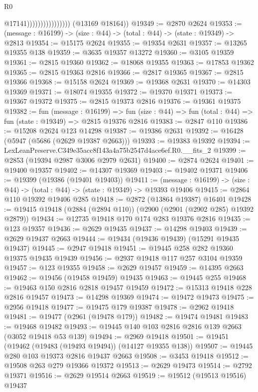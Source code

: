 \begin{lexlean}{R0}
\begin{coremodule}
                                      @17141))))))))))))))))
      (@13169 @18164))
@19349 := @2870 @2624
@19353 := (message : @16199) -> (size : @44) -> (total : @44) -> (state : @19349) -> @2813
@19354 := @15175 @2624
@19355 := @19354 @2631
@19357 := @13265 @19355 @138
@19359 := @3635 @19357 @13272
@19360 := @3105 @19359
@19361 := @2815 @19360
@19362 := @18068 @19355
@19363 := @17853 @19362
@19365 := @2815 @19363 @2816
@19366 := @2817 @19365
@19367 := @2815 @19366
@19368 := @15158 @2624
@19369 := @19368 @2631
@19370 := @14303 @19369
@19371 := @18074 @19355
@19372 := @19370 @19371
@19373 := @19367 @19372
@19375 := @2815 @19373 @2816
@19376 := @19361 @19375
@19382 := fun (message : @16199) =>
  fun (size : @44) => fun (total : @44) => fun (state : @19349) => @2815 @19376 @2816
@19383 := @2847 @110
@19386 := @15208 @2624 @123 @14298
@19387 := @19386 @2631
@19392 := @16428 (@5947 (@5686 (@2629 @19387 @2663)))
@19393 := @19383 @19392
@19394 := LexLeanPreserve.C349e35acc8f143a4a75b2547d4ace6ef.R0.__fits_2
@19399 := @2853 (@19394 @2987 @3006 @2979 @2631)
@19400 := @2874 @2624
@19401 := @19400 @19357
@19402 := @14307 @19369
@19403 := @19402 @19371
@19406 := @19399 (@19386 (@19401 @19403))
@19411 := (message : @16199) -> (size : @44) -> (total : @44) -> (state : @19349) -> @19393 @19406
@19415 := @2864 @110 @19392 @19406 @285
@19418 := @2872 (@13864 @19387) @16401
@19428 := @19415 @19418 (@2884 (@2894 @110)) (@2900 (@2901 (@2902 @285) @19392 @2879))
@19434 := @12735 @19418 @170 @174 @283 @19376 @2816
@19435 := @123 @19357
@19436 := @2629 @19435
@19437 := @14298 @19403
@19439 := @2629 @19437 @2663
@19444 := @19434 (@19436 @19439) (@15291 @19435 @19437)
@19445 := @2947 @19418
@19451 := @19445 @258 @282 @19360 @19375 @19435 @19439
@19456 := @2937 @19418 @117 @257 @3104 @19359
@19457 := @123 @19355
@19458 := @2629 @19457
@19459 := @14395 @2663
@19462 := @19456 (@19458 @19459) @19435
@19463 := @19445 @255
@19468 := @19463 @150 @2816 @2818 @19457 @19459
@19472 := @15313 @19418 @228 @2816 @19457
@19473 := @14298 @19369
@19474 := @19472 @19473
@19475 := @2956 @19418
@19477 := @19475 @179 @19387
@19478 := @2962 @19418
@19481 := @19477 (@2961 (@19478 @179))
@19482 := @19474 @19481
@19483 := @19468 @19482
@19493 := @19445 @140 @103 @2816 @2816 @139 @2663 (@3052 @19418 @53 @139)
@19494 := @2969 @19418
@19501 := @19451 (@19462 (@19483 (@19493 @19494)) (@14127 @19355 @138))
@19507 := @19445 @280 @103 @19373 @2816 @19437 @2663
@19508 := @3453 @19418
@19512 := @19508 @263 @279 @19366 @19372
@19513 := @2629 @19473
@19514 := @2792 @19371
@19516 := @2629 @19514 @2663
@19519 := @19512 (@19513 @19516) @19437

\end{coremodule}
\end{lexlean}
